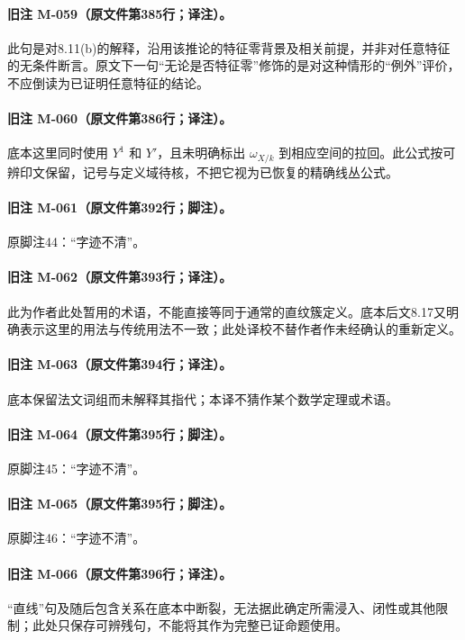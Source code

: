 \paragraph{旧注 M-059（原文件第385行；译注）。}
此句是对8.11(b)的解释，沿用该推论的特征零背景及相关前提，并非对任意特征的无条件断言。原文下一句“无论是否特征零”修饰的是对这种情形的“例外”评价，不应倒读为已证明任意特征的结论。

\paragraph{旧注 M-060（原文件第386行；译注）。}
底本这里同时使用 $Y^1$ 和 $Y'$，且未明确标出 $\omega_{X/k}$ 到相应空间的拉回。此公式按可辨印文保留，记号与定义域待核，不把它视为已恢复的精确线丛公式。

\paragraph{旧注 M-061（原文件第392行；脚注）。}
原脚注44：“字迹不清”。

\paragraph{旧注 M-062（原文件第393行；译注）。}
此为作者此处暂用的术语，不能直接等同于通常的直纹簇定义。底本后文8.17又明确表示这里的用法与传统用法不一致；此处译校不替作者作未经确认的重新定义。

\paragraph{旧注 M-063（原文件第394行；译注）。}
底本保留法文词组而未解释其指代；本译不猜作某个数学定理或术语。

\paragraph{旧注 M-064（原文件第395行；脚注）。}
原脚注45：“字迹不清”。

\paragraph{旧注 M-065（原文件第395行；脚注）。}
原脚注46：“字迹不清”。

\paragraph{旧注 M-066（原文件第396行；译注）。}
“直线”句及随后包含关系在底本中断裂，无法据此确定所需浸入、闭性或其他限制；此处只保存可辨残句，不能将其作为完整已证命题使用。

